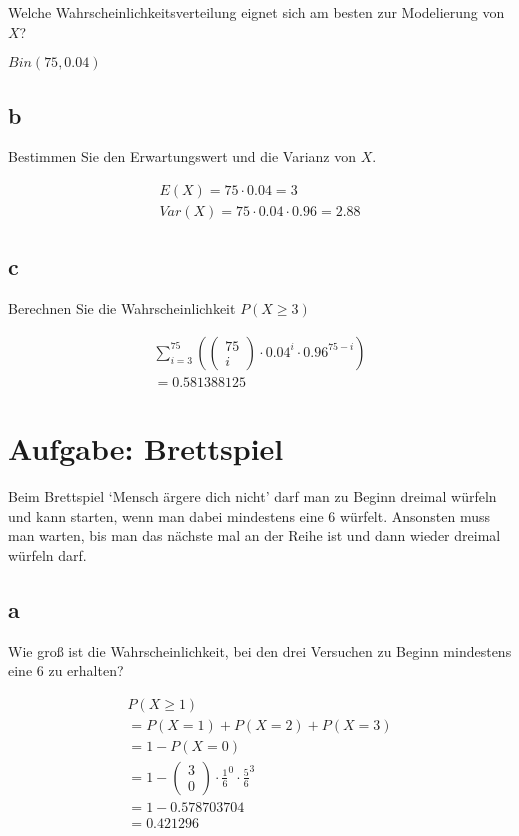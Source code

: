 Welche Wahrscheinlichkeitsverteilung eignet sich am besten zur Modelierung von
$X$?

$Bin(75, 0.04)$

\subsection{b}

Bestimmen Sie den Erwartungswert und die Varianz von $X$.

\begin{align*}
    E(X) = 75 \cdot 0.04 = 3 \\
    Var(X) = 75 \cdot 0.04 \cdot 0.96 = 2.88
\end{align*}

\subsection{c}

Berechnen Sie die Wahrscheinlichkeit $P(X \geq 3)$

\begin{align*}
    \sum_{i = 3}^{75} \left(\begin{pmatrix}
                                75 \\ i
                            \end{pmatrix} \cdot 0.04^i \cdot 0.96^{75 - i}\right) \\
    = 0.581388125
\end{align*}

\section{Aufgabe: Brettspiel}

Beim Brettspiel `Mensch ärgere dich nicht' darf man zu Beginn dreimal würfeln
und kann starten, wenn man dabei mindestens eine 6 würfelt. Ansonsten muss man
warten, bis man das nächste mal an der Reihe ist und dann wieder dreimal
würfeln darf.

\subsection{a}

Wie groß ist die Wahrscheinlichkeit, bei den drei Versuchen zu Beginn
mindestens eine 6 zu erhalten?

\begin{align*}
    P(X \geq 1)                                                 \\
    = P(X = 1) + P(X = 2) + P(X = 3)                            \\
    = 1 - P(X = 0)                                              \\
    = 1 - \begin{pmatrix}
              3 \\ 0
          \end{pmatrix} \cdot \frac{1}{6}^0 \cdot \frac{5}{6}^3 \\
    = 1 - 0.578703704                                           \\
    = 0.421296
\end{align*}

